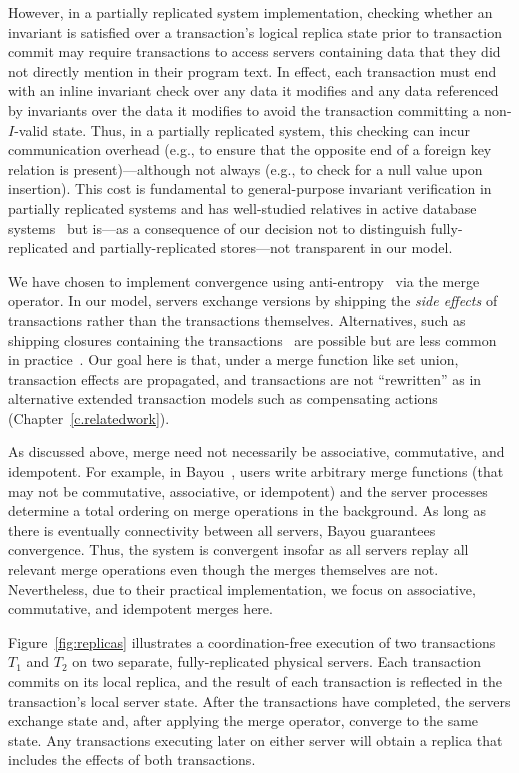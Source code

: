 However, in a partially replicated system implementation, checking
whether an invariant is satisfied over a transaction's logical replica
state prior to transaction commit may require transactions to access
servers containing data that they did not directly mention in their
program text. In effect, each transaction must end with an inline
invariant check over any data it modifies and any data referenced by
invariants over the data it modifies to avoid the transaction
committing a non-$I$-valid state. Thus, in a partially replicated
system, this checking can incur communication overhead (e.g., to
ensure that the opposite end of a foreign key relation is
present)---although not always (e.g., to check for a null value upon
insertion). This cost is fundamental to general-purpose invariant
verification in partially replicated systems and has well-studied
relatives in active database
systems~\cite{aiken-confluence,activedb-book} but is---as a
consequence of our decision not to distinguish fully-replicated and
partially-replicated stores---not transparent in our model.

 We have chosen to implement
convergence using anti-entropy~\cite{antientropy,optimistic} via the
merge operator. In our model, servers exchange versions by shipping
the \textit{side effects} of transactions rather than the transactions
themselves. Alternatives, such as shipping closures containing the
transactions~\cite{bayou} are possible but are less common in
practice~\cite{queue,dynamo}. Our goal here is that, under a merge
function like set union, transaction effects are propagated, and
transactions are not ``rewritten'' as in alternative extended
transaction models such as compensating actions
(Chapter~\ref{c.relatedwork}).

 As discussed above, merge need not
necessarily be associative, commutative, and idempotent. For example,
in Bayou~\cite{bayou}, users write arbitrary merge functions (that may
not be commutative, associative, or idempotent) and the server
processes determine a total ordering on merge operations in the
background. As long as there is eventually connectivity between all
servers, Bayou guarantees convergence. Thus, the system is convergent
insofar as all servers replay all relevant merge operations even
though the merges themselves are not. Nevertheless, due to their
practical implementation, we focus on associative, commutative, and
idempotent merges here.

 Figure~\ref{fig:replicas} illustrates a
coordination-free execution of two transactions $T_1$ and $T_2$ on two
separate, fully-replicated physical servers. Each transaction commits
on its local replica, and the result of each transaction is reflected
in the transaction's local server state. After the transactions have
completed, the servers exchange state and, after applying the merge
operator, converge to the same state. Any transactions executing later on
either server will obtain a replica that includes the effects of both transactions.
